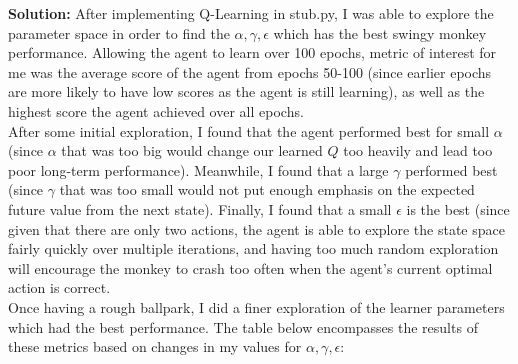 \documentclass[submit]{harvardml}
\begin{document}
\textbf{Solution:}
After implementing Q-Learning in stub.py, I was able to explore the parameter space in order to find the $\alpha, \gamma, \epsilon$ which has the best swingy monkey performance. Allowing the agent to learn over 100 epochs, metric of interest for me was the average score of the agent from epochs 50-100 (since earlier epochs are more likely to have low scores as the agent is still learning), as well as the highest score the agent achieved over all epochs. \\
After some initial exploration, I found that the agent performed best for small $\alpha$ (since $\alpha$ that was too big would change our learned $Q$ too heavily and lead too poor long-term performance). Meanwhile, I found that a large $\gamma$ performed best (since $\gamma$ that was too small would not put enough emphasis on the expected future value from the next state). Finally, I found that a small $\epsilon$ is the best (since given that there are only two actions, the agent is able to explore the state space fairly quickly over multiple iterations, and having too much random exploration will encourage the monkey to crash too often when the agent's current optimal action is correct.    \\
Once having a rough ballpark, I did a finer exploration of the learner parameters which had the best performance. The table below encompasses the results of these metrics based on changes in my values for $\alpha, \gamma, \epsilon$:
\end{document}
